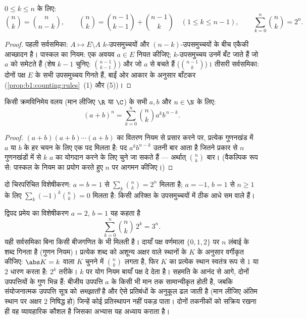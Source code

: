 \begin{proposition}[मूल सर्वसमिकाएँ]\label{prop:b1:counting:identities}
$0 \leq k \leq n$ के लिए:
\[
\binom{n}{k} = \binom{n}{n-k},
\qquad
\binom{n}{k} = \binom{n-1}{k-1} + \binom{n-1}{k}
\quad (1 \leq k \leq n-1),
\qquad
\sum_{k=0}^{n} \binom{n}{k} = 2^n .
\]
\end{proposition}

\begin{proof}
पहली सर्वसमिका: $A \mapsto E \setminus A$ $k$-उपसमुच्चयों और
$(n-k)$-उपसमुच्चयों के बीच एकैकी आच्छादन है। पास्कल का नियम: एक अवयव $a \in E$ नियत कीजिए; $k$-उपसमुच्चय उनमें बँट जाते हैं जो $a$
को समेटते हैं (शेष $k - 1$ चुनिए: $\binom{n-1}{k-1}$) और जो $a$ से बचते हैं
($\binom{n-1}{k}$)। तीसरी सर्वसमिका: दोनों पक्ष $E$ के सभी उपसमुच्चय गिनते
हैं, बाईं ओर आकार के अनुसार बाँटकर (\cref{prop:b1:counting:rules}~(1) और
(5))।
\end{proof}

\begin{theorem}[द्विपद प्रमेय]\label{thm:b1:counting:binomial}
किसी क्रमविनिमेय वलय (मान लीजिए $\R$ या $\C$) के सभी $a, b$ और $n \in \N$ के
लिए:
\[
(a + b)^n = \sum_{k=0}^{n} \binom{n}{k} a^k b^{\,n-k} .
\]
\end{theorem}

\begin{proof}
$(a+b)(a+b)\cdots(a+b)$ का वितरण नियम से प्रसार करने पर, प्रत्येक गुणनखंड
में $a$ या $b$ के हर चयन के लिए एक पद मिलता है: पद $a^k b^{n-k}$ उतनी बार
आता है जितने प्रकार से $n$ गुणनखंडों में से $k$ $a$ का योगदान करने के लिए
चुने जा सकते हैं --- अर्थात् $\binom nk$ बार। (वैकल्पिक रूप से: पास्कल के
नियम का प्रयोग करते हुए $n$ पर आगमन कीजिए।)
\end{proof}

\begin{example}\label{ex:b1:counting:binomial}
दो चिरपरिचित विशेषीकरण: $a = b = 1$ से $\sum_k \binom nk = 2^n$ मिलता है; $a
= -1$, $b = 1$ से $n \geq 1$ के लिए $\sum_{k} (-1)^k \binom nk = 0$ मिलता
है: किसी अरिक्त  के उपसमुच्चयों में ठीक आधे सम  वाले हैं।
\end{example}

\begin{example}\label{ex:b1:counting:threen}
द्विपद प्रमेय का विशेषीकरण $a = 2$, $b = 1$ यह कहता है
\[
\sum_{k=0}^{n} \binom nk\,2^k = 3^n .
\]
यही सर्वसमिका बिना किसी बीजगणित के भी मिलती है। दायाँ पक्ष वर्णमाला $\{0, 1,
2\}$ पर $n$ लंबाई के शब्द गिनता है (गुणन नियम)। प्रत्येक शब्द को अशून्य
अक्षर वाले स्थानों के  $K$ के अनुसार वर्गीकृत कीजिए: $\abs K = k$
वाला $K$ चुनने में $\binom nk$ लगता है, फिर $K$ का प्रत्येक स्थान स्वतंत्र
रूप से $1$ या $2$ धारण करता है: $2^k$ तरीके। $k$ पर योग नियम बायाँ पक्ष दे
देता है। सहमति के आनंद से आगे, दोनों उपपत्तियों के गुण भिन्न हैं: बीजीय
उपपत्ति $a$ के किसी भी मान तक सामान्यीकृत होती है, जबकि संयोजनात्मक उपपत्ति
सूत्र को \emph{समझाती} है और ऐसे प्रतिबंधों के अनुकूल ढल जाती है (मान लीजिए
अंतिम स्थान पर अक्षर $2$ निषिद्ध हो) जिन्हें कोई प्रतिस्थापन नहीं पकड़ पाता।
दोनों तकनीकों को सक्रिय रखना ही वह व्यावहारिक कौशल है जिसका अभ्यास यह अध्याय
कराता है।
\end{example}

